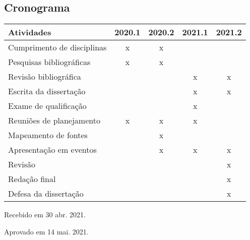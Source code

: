 \begin{refsection}
    \section{Cronograma}

    \begin{center}
        \begin{tabular}{ l c c c c }
            \toprule
            Atividades                 & 2020.1 & 2020.2 & 2021.1 & 2021.2 \\
            \midrule
            Cumprimento de disciplinas & x      & x      &        &        \\
            Pesquisas bibliográficas   & x      & x      &        &        \\
            Revisão bibliográfica      &        &        & x      & x      \\
            Escrita da dissertação     &        &        & x      & x      \\
            Exame de qualificação      &        &        & x      &        \\
            Reuniões de planejamento   & x      & x      & x      &        \\
            Mapeamento de fontes       &        & x      &        &        \\
            Apresentação em eventos    &        & x      & x      & x      \\
            Revisão                    &        &        &        & x      \\
            Redação final              &        &        &        & x      \\
            Defesa da dissertação      &        &        &        & x      \\
            \bottomrule
         \end{tabular}
    \end{center}

    \printbibliography[heading=subbibliography,notcategory=fullcited]

    \hfill Recebido em 30 abr. 2021.

    \hfill Aprovado em 14 mai. 2021.

    \label{chap:politicamoderend}

\end{refsection}
